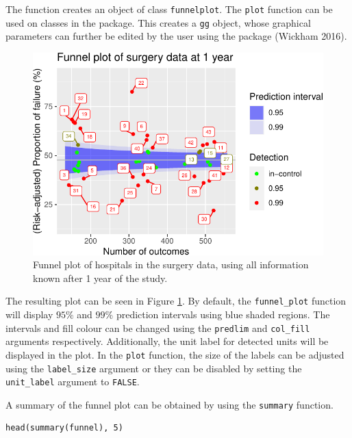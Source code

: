 The function creates an object of class \texttt{\textquotesingle{}funnelplot\textquotesingle{}}. The \texttt{plot} function can be used on classes in the  package. This creates a \texttt{\textquotesingle{}gg\textquotesingle{}} object, whose graphical parameters can further be edited by the user using the package  (Wickham 2016).

\begin{figure}
\centering
\includegraphics{RJ-2023-095_files/figure-latex/funnel-p-1.pdf}
\caption{\label{fig:funnel-p}Funnel plot of hospitals in the surgery data, using all information known after 1 year of the study.}
\end{figure}

The resulting plot can be seen in Figure \ref{fig:funnel-p}. By default, the \texttt{funnel\_plot} function will display \(95 \%\) and \(99 \%\) prediction intervals using blue shaded regions. The intervals and fill colour can be changed using the \texttt{predlim} and \texttt{col\_fill} arguments respectively. Additionally, the unit label for detected units will be displayed in the plot. In the \texttt{plot} function, the size of the labels can be adjusted using the \texttt{label\_size} argument or they can be disabled by setting the \texttt{unit\_label} argument to \texttt{FALSE}.

A summary of the funnel plot can be obtained by using the \texttt{summary} function.

\begin{verbatim}
head(summary(funnel), 5)
\end{verbatim}

